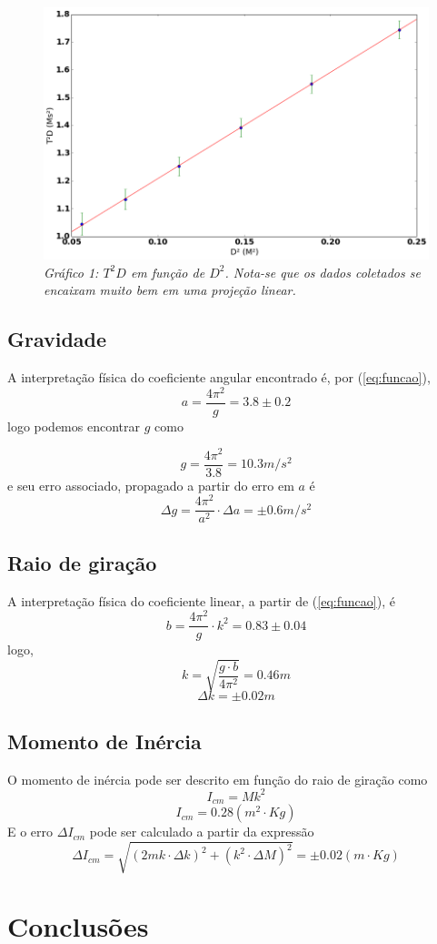 \documentclass[12pt,a4paper]{article}
\begin{document}
\begin{figure}[!hbtbp]

\includegraphics[scale=0.55]{index.png} 
\emph{Gráfico 1: $T^2D$ em função de $D^2$. Nota-se que os dados coletados se encaixam muito bem em uma projeção linear.}

\label{fig:Grafico}
\end{figure}
\subsection{Gravidade}
A interpretação física do coeficiente angular encontrado é, por (\ref{eq:funcao}),
 $$ a = \frac{4\pi^2}{g} = 3.8 \pm 0.2$$
  logo podemos encontrar $g$ como 

  $$ g = \frac{4\pi^2}{3.8} = 10.3 m/s^2 $$ 
  e seu erro associado, propagado a partir do erro em $a$ é
  $$ \Delta g = \frac{4\pi^2}{a^2} \cdot \Delta a = \pm 0.6 m/s^2 $$
  
\subsection{Raio de giração}

A interpretação física do coeficiente linear, a partir de (\ref{eq:funcao}), é 
$$ b = \frac{4\pi^2}{g} \cdot k^2 = 0.83 \pm 0.04 $$
logo, 
$$ k = \sqrt{\frac{g \cdot b}{4\pi^2}} = 0.46 m $$
$$ \Delta k = \pm 0.02  m$$

\subsection{Momento de Inércia}
O momento de inércia pode ser descrito em função do raio de giração como 
$$ I_{cm}  = Mk^2 $$
$$ I_{cm}  = 0.28 (m^2 \cdot Kg)$$
E o erro $ \Delta I_{cm}$ pode ser calculado a partir da expressão 
$$\Delta I_{cm}  =\sqrt{(2mk \cdot \Delta k)^2 + (k^2 \cdot \Delta M)^2} = \pm 0.02 (m \cdot Kg) $$

\section{Conclusões}
\end{document}
